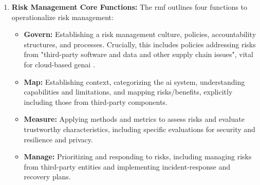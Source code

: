 \begin{enumerate}
\item \textbf{Risk Management Core Functions:} The \gls{rmf} outlines four functions to operationalize risk management:
\begin{itemize}
  \item \textbf{Govern:} Establishing a risk management culture, policies, accountability structures, and processes. Crucially, this includes policies addressing risks from "third-party software and data and other supply chain issues", vital for cloud-based \gls{genai} \cite[pp.21-24]{tabassi_artificial_2023}.
  \item \textbf{Map:} Establishing context, categorizing the \gls{ai} system, understanding capabilities and limitations, and mapping risks/benefits, explicitly including those from third-party components\cite{tabassi_artificial_2023}.
  \item \textbf{Measure:} Applying methods and metrics to assess risks and evaluate trustworthy characteristics, including specific evaluations for security and resilience and privacy\cite{tabassi_artificial_2023}.
  \item \textbf{Manage:} Prioritizing and responding to risks, including managing risks from third-party entities and implementing \gls{incident-response} and recovery plans\cite{tabassi_artificial_2023}.
\end{itemize}
\end{enumerate}

